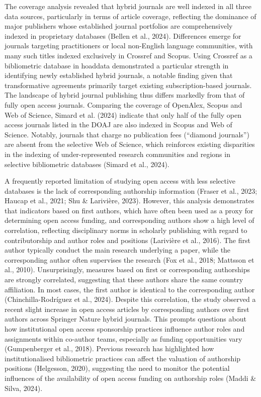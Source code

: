 \documentclass[a4paper,man,floatsintext,longtable,noextraspace,10pt]{apa6}
\begin{document}
The coverage analysis revealed that hybrid journals are well indexed in
all three data sources, particularly in terms of article coverage,
reflecting the dominance of major publishers whose established journal
portfolios are comprehensively indexed in proprietary databases (Bellen
et al., 2024). Differences emerge for journals targeting practitioners
or local non-English language communities, with many such titles indexed
exclusively in Crossref and Scopus. Using Crossref as a bibliometric
database in hoaddata demonstrated a particular strength in identifying
newly established hybrid journals, a notable finding given that
transformative agreements primarily target existing subscription-based
journals. The landscape of hybrid journal publishing thus differs
markedly from that of fully open access journals. Comparing the coverage
of OpenAlex, Scopus and Web of Science, Simard et al. (2024) indicate
that only half of the fully open access journals listed in the DOAJ are
also indexed in Scopus and Web of Science. Notably, journals that charge
no publication fees (``diamond journals'') are absent from the selective
Web of Science, which reinforces existing disparities in the indexing of
under-represented research communities and regions in selective
bibliometric databases (Simard et al., 2024).

A frequently reported limitation of studying open access with less
selective databases is the lack of corresponding authorship information
(Fraser et al., 2023; Haucap et al., 2021; Shu \& Larivière, 2023).
However, this analysis demonstrates that indicators based on first
authors, which have often been used as a proxy for determining open
access funding, and corresponding authors show a high level of
correlation, reflecting disciplinary norms in scholarly publishing with
regard to contributorship and author roles and positions (Larivière et
al., 2016). The first author typically conduct the main research
underlying a paper, while the corresponding author often supervises the
research (Fox et al., 2018; Mattsson et al., 2010). Unsurprisingly,
measures based on first or corresponding authorships are strongly
correlated, suggesting that these authors share the same country
affiliation. In most cases, the first author is identical to the
corresponding author (Chinchilla-Rodríguez et al., 2024). Despite this
correlation, the study observed a recent slight increase in open access
articles by corresponding authors over first authors across Springer
Nature hybrid journals. This prompts questions about how institutional
open access sponsorship practices influence author roles and assignments
within co-author teams, especially as funding opportunities vary
(Gumpenberger et al., 2018). Previous research has highlighted how
institutionalised bibliometric practices can affect the valuation of
authorship positions (Helgesson, 2020), suggesting the need to monitor
the potential influences of the availability of open access funding on
authorship roles (Maddi \& Silva, 2024).
\end{document}
